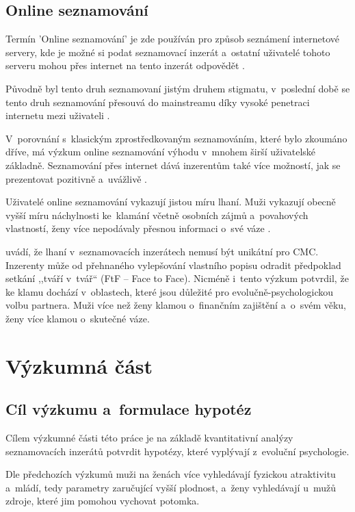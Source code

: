 \documentclass[a4paper, 12pt, notitlepage, oneside, numbers=noenddot]{report}
\begin{document}
\section{Online seznamování}

Termín 'Online seznamování' je zde používán pro způsob seznámení
internetové servery, kde je možné si podat seznamovací inzerát
a~ostatní uživatelé tohoto serveru mohou přes internet na tento
inzerát odpovědět \citep{HallEtAl2010,EllisonEtAl2006}.

Původně byl tento druh seznamovaní jistým druhem stigmatu, v~poslední
době se tento druh seznamování přesouvá do mainstreamu díky vysoké
penetraci internetu mezi uživateli \citep{GibbsEtAl2006, HallEtAl2010,
  EllisonEtAl2006}.

V~porovnání s~klasickým zprostředkovaným seznamováním, které bylo
zkoumáno dříve, má výzkum online seznamování výhodu v~mnohem širší
uživatelské základně.  Seznamování přes internet dává inzerentům také
více možností, jak se prezentovat pozitivně a~uvážlivě
\citep{GibbsEtAl2006}.

Uživatelé online seznamování vykazují jistou míru lhaní.  Muži
vykazují obecně vyšší míru náchylnosti ke~klamání včetně osobních
zájmů a~povahových vlastností, ženy více nepodávaly přesnou informaci
o~své váze \citep{HallEtAl2010}.

\citet{HallEtAl2010} uvádí, že lhaní v~seznamovacích inzerátech nemusí
být unikátní pro CMC.  Inzerenty může od přehnaného vylepšování
vlastního popisu odradit předpoklad setkání ,,tváří v~tvář`` (FtF --
Face to Face).  Nicméně i~tento výzkum potvrdil, že ke klamu dochází
v~oblastech, které jsou důležité pro evolučně-psychologickou volbu
partnera.  Muži více než ženy klamou o~finančním zajištění a~o~svém
věku, ženy více klamou o~skutečné váze.

\chapter{Výzkumná část}
\section{Cíl výzkumu a~formulace hypotéz}
Cílem výzkumné části této práce je na základě kvantitativní analýzy
seznamovacích inzerátů potvrdit hypotézy, které vyplývají z~evoluční
psychologie.

Dle předchozích výzkumů \citep{BussEtAl1990,GreenlessMcGrew1994,%
  Gil-BurmanPelaezSanchez2002,WayfordDunbar1995,HarrisonSaeed1977}
muži na ženách více vyhledávají fyzickou atraktivitu a~mládí, tedy
parametry zaručující vyšší plodnost, a~ženy vyhledávají u~mužů zdroje,
které jim pomohou vychovat potomka.
\end{document}
